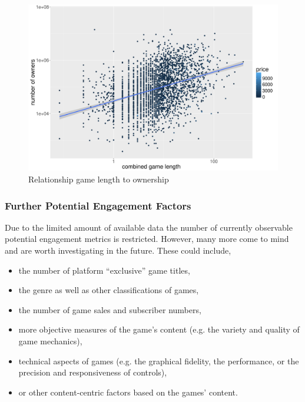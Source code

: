 \begin{figure}[!t]
	\centering
	\includegraphics[width=1.0\columnwidth]{images/rel-combinedlength-owners.pdf}
	\caption{Relationship game length to ownership}
\label{fig:rel-combinedlength-owners}
\end{figure}


\subsubsection{Further Potential Engagement Factors}

Due to the limited amount of available data the number of currently observable potential engagement metrics is restricted. However, many more come to mind and are worth investigating in the future. These could include,

\begin{itemize}
	\item the number of platform ``exclusive'' game titles,
	\item the genre as well as other classifications of games,
	\item the number of game sales and subscriber numbers,
	\item more objective measures of the game's content (e.g. the variety and quality of game mechanics),
	\item technical aspects of games (e.g. the graphical fidelity, the performance, or the precision and responsiveness of controls),
	\item or other content-centric factors based on the games' content.
\end{itemize}




